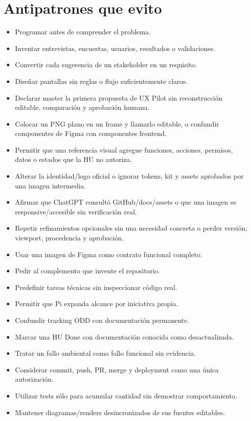 \documentclass[11pt,a4paper]{article}
\begin{document}
\section{Antipatrones que evito}

\begin{itemize}
    \item Programar antes de comprender el problema.
    \item Inventar entrevistas, encuestas, usuarios, resultados o validaciones.
    \item Convertir cada sugerencia de un stakeholder en un requisito.
    \item Diseñar pantallas sin reglas o flujo suficientemente claros.
    \item Declarar master la primera propuesta de UX Pilot sin reconstrucción editable, comparación y aprobación humana.
    \item Colocar un PNG plano en un frame y llamarlo editable, o confundir componentes de Figma con componentes frontend.
    \item Permitir que una referencia visual agregue funciones, acciones, permisos, datos o estados que la HU no autoriza.
    \item Alterar la identidad/logo oficial o ignorar tokens, kit y assets aprobados por una imagen intermedia.
    \item Afirmar que ChatGPT consultó GitHub/docs/assets o que una imagen es responsive/accesible sin verificación real.
    \item Repetir refinamientos opcionales sin una necesidad concreta o perder versión, viewport, procedencia y aprobación.
    \item Usar una imagen de Figma como contrato funcional completo.
    \item Pedir al complemento que invente el repositorio.
    \item Predefinir tareas técnicas sin inspeccionar código real.
    \item Permitir que Pi expanda alcance por iniciativa propia.
    \item Confundir tracking ODD con documentación permanente.
    \item Marcar una HU Done con documentación conocida como desactualizada.
    \item Tratar un fallo ambiental como fallo funcional sin evidencia.
    \item Considerar commit, push, PR, merge y deployment como una única autorización.
    \item Utilizar tests sólo para acumular cantidad sin demostrar comportamiento.
    \item Mantener diagramas/renders desincronizados de sus fuentes editables.
\end{itemize}
\end{document}
